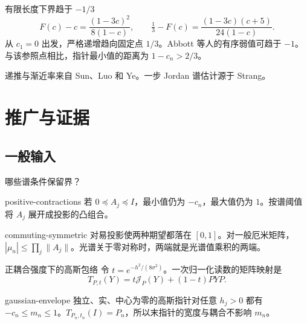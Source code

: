 \documentclass{beamer}
\begin{document}
\begin{frame}{有限长度下界趋于 $-1/3$}
\[
 F(c)-c=\frac{(1-3c)^2}{8(1-c)},\qquad
 \tfrac13-F(c)=\frac{(1-3c)(c+5)}{24(1-c)}.
\]
从 $c_1=0$ 出发，严格递增趋向固定点 $1/3$。Abbott 等人的有序弱值可趋于 $-1$。与该参照点相比，指针最小值的距离为 $1-c_n>2/3$。
\medskip

递推与渐近率来自 Sun、Luo 和 Ye。一步 Jordan 谱估计源于 Strang。
\end{frame}

\section{推广与证据}
\subsection{一般输入}
\begin{frame}{哪些谱条件保留界？}
\begin{bookresult}{positive-contractions}
若 $0\preceq A_j\preceq I$，最小值仍为 $-c_n$，最大值仍为 $1$。按谱阈值将 $A_j$ 展开成投影的凸组合。
\end{bookresult}
\begin{bookresult}{commuting-symmetric}
对易投影使两种期望都落在 $[0,1]$。对一般厄米矩阵，$|\mu_n|\le\prod_j\|A_j\|$。光谱关于零对称时，两端就是光谱值乘积的两端。
\end{bookresult}
\end{frame}

\begin{frame}{正耦合强度下的高斯包络}
令 $t=e^{-h^2/(8\sigma^2)}$。一次归一化读数的矩阵映射是
\[
 T_{P,t}(Y)=t\mathcal J_P(Y)+(1-t)PYP.
\]
\begin{bookresult}{gaussian-envelope}
独立、实、中心为零的高斯指针对任意 $h_j>0$ 都有 $-c_n\le m_n\le1$。$T_{P_n,t_n}(I)=P_n$，所以末指针的宽度与耦合不影响 $m_n$。
\end{bookresult}
\end{frame}
\end{document}
